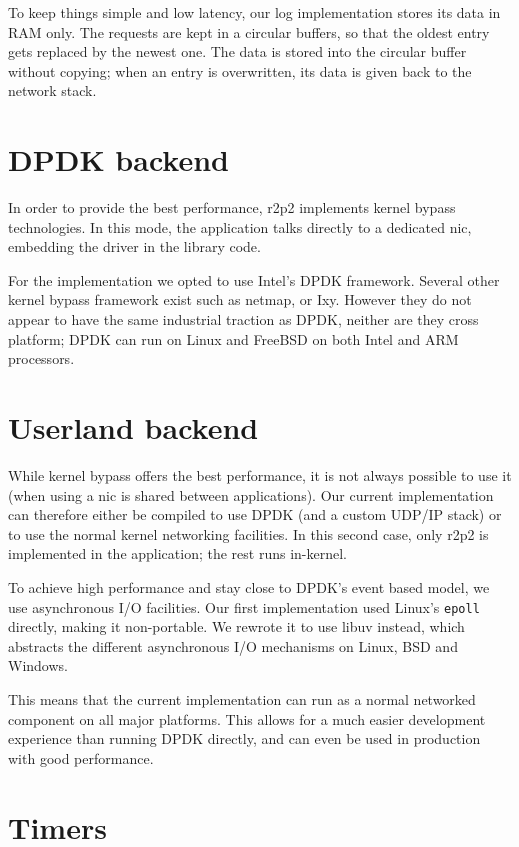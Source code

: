 To keep things simple and low latency, our log implementation stores its data in RAM only.
The requests are kept in a circular buffers, so that the oldest entry gets replaced by the newest one.
The data is stored into the circular buffer without copying; when an entry is overwritten, its data is given back to the network stack.

\section{DPDK backend}

In order to provide the best performance, \gls{r2p2} implements kernel bypass technologies.
In this mode, the application talks directly to a dedicated \gls{nic}, embedding the driver in the library code.

For the implementation we opted to use Intel's DPDK framework.
Several other kernel bypass framework exist such as netmap\cite{netmap}, or Ixy\cite{ixy}.
However they do not appear to have the same industrial traction as DPDK, neither are they cross platform; DPDK can run on Linux and FreeBSD on both Intel and ARM processors.

\section{Userland backend}

While kernel bypass offers the best performance, it is not always possible to use it (\ie when using a \gls{nic} is shared between applications).
Our current implementation can therefore either be compiled to use DPDK (and a custom UDP/IP stack) or to use the normal kernel networking facilities.
In this second case, only \gls{r2p2} is implemented in the application; the rest runs in-kernel.

To achieve high performance and stay close to DPDK's event based model, we use asynchronous I/O facilities.
Our first implementation used Linux's \texttt{epoll} directly, making it non-portable.
We rewrote it to use libuv instead, which abstracts the different asynchronous I/O mechanisms on Linux, BSD and Windows.

This means that the current implementation can run as a normal networked component on all major platforms.
This allows for a much easier development experience than running DPDK directly, and can even be used in production with good performance.

\section{Timers}

